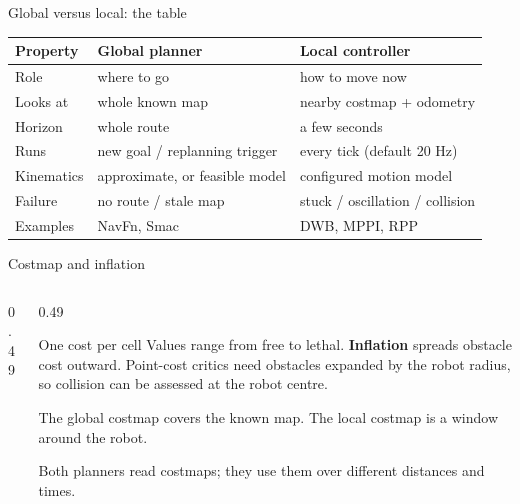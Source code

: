 \documentclass[aspectratio=169]{beamer}
\begin{document}
\begin{frame}[t]{Global versus local: the table}
\small
\setlength{\abovedisplayskip}{1mm}\setlength{\belowdisplayskip}{1mm}
\setlength{\abovedisplayshortskip}{0pt}\setlength{\belowdisplayshortskip}{0pt}
\renewcommand{\arraystretch}{1.1}\begin{tabularx}{\linewidth}{lXX}
\toprule Property & Global planner & Local controller\\\midrule
Role & where to go & how to move now\\
Looks at & whole known map & nearby costmap + odometry\\
Horizon & whole route & a few seconds\\
Runs & new goal / replanning trigger & every tick (default 20 Hz)\\
Kinematics & approximate, or feasible model & configured motion model\\
Failure & no route / stale map & stuck / oscillation / collision\\
Examples & NavFn, Smac & DWB, MPPI, RPP\\\bottomrule\end{tabularx}
\par\vspace{1mm}{\scriptsize Defaults in the Nav2 repository; check your release.}
\end{frame}

\begin{frame}[t]{Costmap and inflation}
\small
\setlength{\abovedisplayskip}{1mm}\setlength{\belowdisplayskip}{1mm}
\setlength{\abovedisplayshortskip}{0pt}\setlength{\belowdisplayshortskip}{0pt}
\begin{columns}[T,onlytextwidth]\begin{column}{0.49\textwidth}
\centering{}\end{column}\begin{column}{0.49\textwidth}
\begin{block}{One cost per cell}
Values range from free to lethal. \textbf{Inflation} spreads obstacle cost outward. Point-cost critics need obstacles expanded by the robot radius, so collision can be assessed at the robot centre.
\end{block}\vspace{2mm}
The global costmap covers the known map. The local costmap is a window around the robot.\vspace{2mm}\par Both planners read costmaps; they use them over different distances and times.\end{column}\end{columns}
\end{frame}
\end{document}
